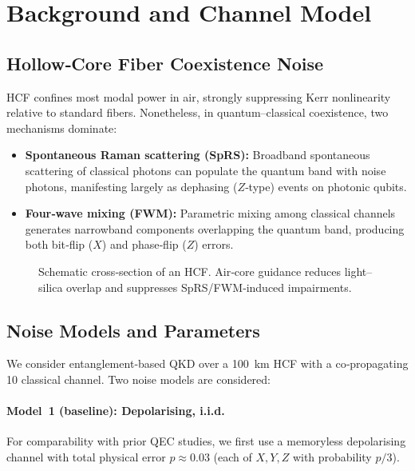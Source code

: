 \documentclass[conference]{IEEEtran}
\begin{document}
\section{Background and Channel Model}\label{sec:background}

\subsection{Hollow‑Core Fiber Coexistence Noise}
HCF confines most modal power in air, strongly suppressing Kerr nonlinearity relative to standard fibers.  Nonetheless, in quantum–classical coexistence, two mechanisms dominate:

\begin{itemize}[leftmargin=*,itemsep=1pt]
  \item \textbf{Spontaneous Raman scattering (SpRS):} Broadband spontaneous scattering of classical photons can populate the quantum band with noise photons, manifesting largely as dephasing ($Z$‑type) events on photonic qubits.
  \item \textbf{Four‑wave mixing (FWM):} Parametric mixing among classical channels generates narrowband components overlapping the quantum band, producing both bit‑flip ($X$) and phase‑flip ($Z$) errors.
\end{itemize}

\begin{figure}[t]
\centering
{}
\caption{Schematic cross‑section of an HCF.  Air‑core guidance reduces light–silica overlap and suppresses SpRS/FWM‑induced impairments.}
\label{fig:hcf}
\end{figure}

\subsection{Noise Models and Parameters}\label{sec:noise_models}
We consider entanglement‑based QKD over a \SI{100}{\kilo\meter} HCF with a co‑propagating \SI{10}{\dBm} classical channel.  Two noise models are considered:

\paragraph*{Model 1 (baseline): Depolarising, i.i.d.}  For comparability with prior QEC studies, we first use a memoryless depolarising channel with total physical error $p\approx 0.03$ (each of $X,Y,Z$ with probability $p/3$).
\end{document}

